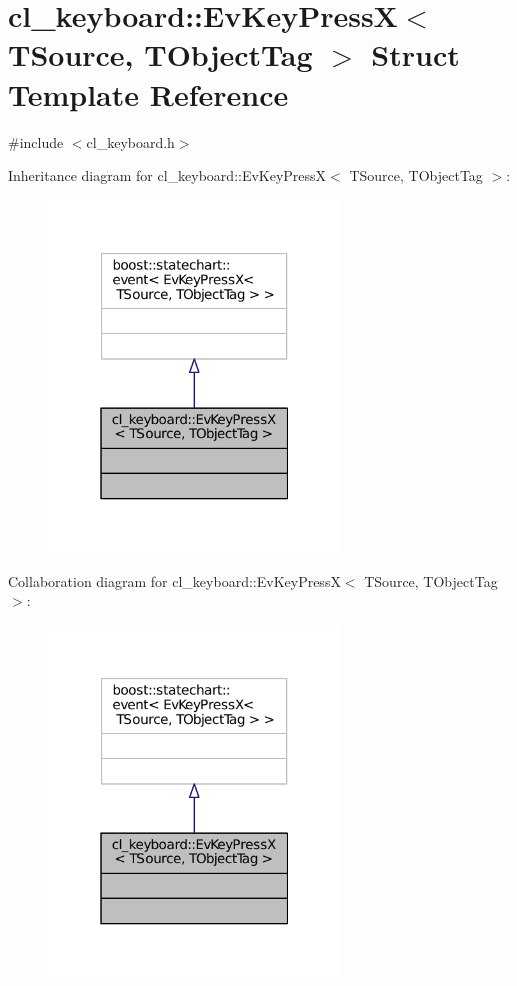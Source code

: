 \hypertarget{structcl__keyboard_1_1EvKeyPressX}{}\section{cl\+\_\+keyboard\+:\+:Ev\+Key\+PressX$<$ T\+Source, T\+Object\+Tag $>$ Struct Template Reference}
\label{structcl__keyboard_1_1EvKeyPressX}


{\ttfamily \#include $<$cl\+\_\+keyboard.\+h$>$}



Inheritance diagram for cl\+\_\+keyboard\+:\+:Ev\+Key\+PressX$<$ T\+Source, T\+Object\+Tag $>$\+:
\nopagebreak
\begin{figure}[H]
\begin{center}
\leavevmode
\includegraphics[width=220pt]{structcl__keyboard_1_1EvKeyPressX__inherit__graph}
\end{center}
\end{figure}


Collaboration diagram for cl\+\_\+keyboard\+:\+:Ev\+Key\+PressX$<$ T\+Source, T\+Object\+Tag $>$\+:
\nopagebreak
\begin{figure}[H]
\begin{center}
\leavevmode
\includegraphics[width=220pt]{structcl__keyboard_1_1EvKeyPressX__coll__graph}
\end{center}
\end{figure}


